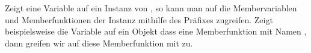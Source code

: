 Zeigt eine Variable  auf ein Instanz von , so kann man auf die Membervariablen und Memberfunktionen der Instanz mithilfe des Präfixes  zugreifen.
Zeigt beispielsweise die Variable  auf ein Objekt dass eine Memberfunktion mit Namen ,
dann greifen wir auf diese Memberfunktion mit  zu.
